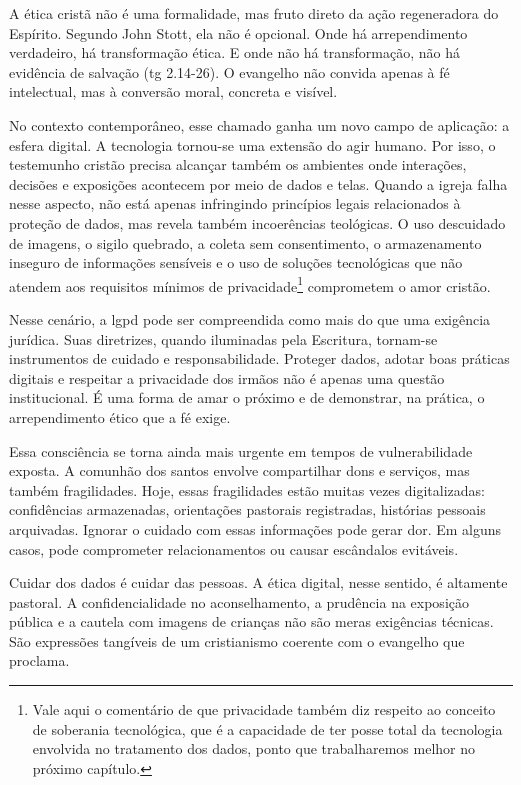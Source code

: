 A ética cristã não é uma formalidade, mas fruto direto da ação regeneradora do Espírito. Segundo John Stott, ela não é opcional. Onde há arrependimento verdadeiro, há transformação ética. E onde não há transformação, não há evidência de salvação (\gls{tg} 2.14-26). O evangelho não convida apenas à fé intelectual, mas à conversão moral, concreta e visível.

No contexto contemporâneo, esse chamado ganha um novo campo de aplicação: a esfera digital. A tecnologia tornou-se uma extensão do agir humano. Por isso, o testemunho cristão precisa alcançar também os ambientes onde interações, decisões e exposições acontecem por meio de dados e telas. Quando a igreja falha nesse aspecto, não está apenas infringindo princípios legais relacionados à proteção de dados, mas revela também incoerências teológicas. O uso descuidado de imagens, o sigilo quebrado, a coleta sem consentimento, o armazenamento inseguro de informações sensíveis e o uso de soluções tecnológicas que não atendem aos requisitos mínimos de privacidade\footnote{Vale aqui o comentário de que privacidade também diz respeito ao conceito de soberania tecnológica, que é a capacidade de ter posse total da tecnologia envolvida no tratamento dos dados, ponto que trabalharemos melhor no próximo capítulo.} comprometem o amor cristão.

Nesse cenário, a \gls{lgpd} pode ser compreendida como mais do que uma exigência jurídica. Suas diretrizes, quando iluminadas pela Escritura, tornam-se instrumentos de cuidado e responsabilidade. Proteger dados, adotar boas práticas digitais e respeitar a privacidade dos irmãos não é apenas uma questão institucional. É uma forma de amar o próximo e de demonstrar, na prática, o arrependimento ético que a fé exige.

Essa consciência se torna ainda mais urgente em tempos de vulnerabilidade exposta. A comunhão dos santos envolve compartilhar dons e serviços, mas também fragilidades. Hoje, essas fragilidades estão muitas vezes digitalizadas: confidências armazenadas, orientações pastorais registradas, histórias pessoais arquivadas. Ignorar o cuidado com essas informações pode gerar dor. Em alguns casos, pode comprometer relacionamentos ou causar escândalos evitáveis.

Cuidar dos dados é cuidar das pessoas. A ética digital, nesse sentido, é altamente pastoral. A confidencialidade no aconselhamento, a prudência na exposição pública e a cautela com imagens de crianças não são meras exigências técnicas. São expressões tangíveis de um cristianismo coerente com o evangelho que proclama.

